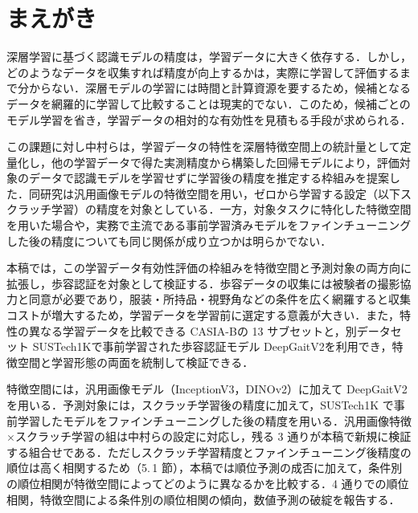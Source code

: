 \documentclass[technicalreport]{ieicej}
\begin{document}
\section{まえがき}
深層学習に基づく認識モデルの精度は，学習データに大きく依存する．しかし，どのようなデータを収集すれば精度が向上するかは，実際に学習して評価するまで分からない．深層モデルの学習には時間と計算資源を要するため，候補となるデータを網羅的に学習して比較することは現実的でない．このため，候補ごとのモデル学習を省き，学習データの相対的な有効性を見積もる手段が求められる．

この課題に対し中村ら\cite{Nakamura_IEICE}は，学習データの特性を深層特徴空間上の統計量として定量化し，他の学習データで得た実測精度から構築した回帰モデルにより，評価対象のデータで認識モデルを学習せずに学習後の精度を推定する枠組みを提案した．同研究は汎用画像モデルの特徴空間を用い，ゼロから学習する設定（以下スクラッチ学習）の精度を対象としている．一方，対象タスクに特化した特徴空間を用いた場合や，実務で主流である事前学習済みモデルをファインチューニングした後の精度についても同じ関係が成り立つかは明らかでない．

本稿では，この学習データ有効性評価の枠組みを特徴空間と予測対象の両方向に拡張し，歩容認証を対象として検証する．歩容データの収集には被験者の撮影協力と同意が必要であり，服装・所持品・視野角などの条件を広く網羅すると収集コストが増大するため，学習データを学習前に選定する意義が大きい．また，特性の異なる学習データを比較できる CASIA-B\cite{Yu_CASIAB}の 13 サブセットと，別データセット SUSTech1K\cite{Shen_LidarGait}で事前学習された歩容認証モデル DeepGaitV2\cite{Fan_DeepGaitV2}を利用でき，特徴空間と学習形態の両面を統制して検証できる．

特徴空間には，汎用画像モデル（InceptionV3，DINOv2）に加えて DeepGaitV2 を用いる．予測対象には，スクラッチ学習後の精度に加えて，SUSTech1K で事前学習したモデルをファインチューニングした後の精度を用いる．汎用画像特徴$\times$スクラッチ学習の組は中村らの設定に対応し，残る 3 通りが本稿で新規に検証する組合せである．ただしスクラッチ学習精度とファインチューニング後精度の順位は高く相関するため（5.\,1 節），本稿では順位予測の成否に加えて，条件別の順位相関が特徴空間によってどのように異なるかを比較する．4 通りでの順位相関，特徴空間による条件別の順位相関の傾向，数値予測の破綻を報告する．

\end{document}
